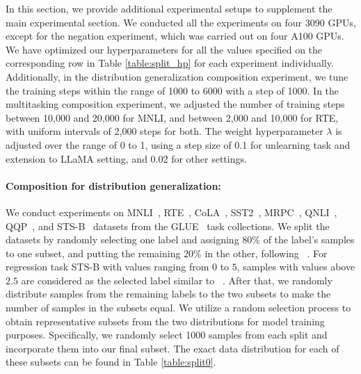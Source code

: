 In this section, we provide additional experimental setups to supplement the main experimental section. We conducted all the experiments on four 3090 GPUs, except for the negation experiment, which was carried out on four A100 GPUs.
We have optimized our hyperparameters for all the values specified on the corresponding row in Table \ref{table:split_hp} for each experiment individually. 
Additionally, in the distribution generalization composition experiment, we tune the training steps within the range of 1000 to 6000 with a step of 1000. In the multitasking composition experiment, we adjusted the number of training steps between 10,000 and 20,000 for MNLI, and between 2,000 and 10,000 for RTE, with uniform intervals of 2,000 steps for both.
The weight hyperparameter $\lambda$ is adjusted over the range of 0 to 1, using a step size of 0.1 for unlearning task and extension to LLaMA setting, and 0.02 for other settings.

\paragraph{Composition for distribution generalization:}
We conduct experiments on MNLI~\citep{williams2017broad}, RTE~\citep{giampiccolo2007third}, CoLA~\citep{warstadt2019cola}, SST2~\citep{socher2013recursive}, MRPC~\citep{dolan2005automatically}, QNLI~\citep{rajpurkar2016squad}, QQP~\citep{iyer2017first}, and STS-B~ \citep{cer2017semeval} datasets from the GLUE~\citep{wang2018glue} task collections.
We split the datasets by randomly selecting one label and assigning $80\%$ of the label's samples to one subset, and putting the remaining $20\%$ in the other, following ~\citet{jin2022dataless}. For regression task STS-B  with values ranging from $0$ to $5$, samples with values above $2.5$ are considered as the selected label similar to ~\citet{matena2022merging}. After that, we randomly distribute samples from the remaining labels to the two subsets to make the number of samples in the subsets equal. 
We utilize a random selection process to obtain representative subsets from the two distributions for model training purposes. Specifically, we randomly select 1000 samples from each split and incorporate them into our final subset. The exact data distribution for each of these subsets can be found in Table \ref{table:split0}.


